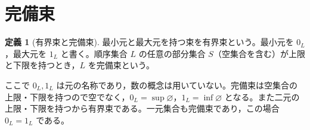 \documentclass[a5paper,10pt,dvipdfmx]{jsarticle}
\theoremstyle{definition}
\newtheorem{defn}[ruledef]{定義}
\theoremstyle{plain}
\begin{document}
\section{完備束}
\begin{defn}[有界束と完備束]\label{k85}
最小元と最大元を持つ束を有界束という。最小元を $0_L$，最大元を $1_L$ と書く。順序集合 $L$ の任意の部分集合 $S$（空集合を含む）が上限と下限を持つとき，$L$ を完備束という。
\end{defn}
ここで $0_L,1_L$ は元の名称であり，数の概念は用いていない。完備束は空集合の上限・下限を持つので空でなく，$0_L=\sup\varnothing$，$1_L=\inf\varnothing$ となる。また二元の上限・下限を持つから有界束である。一元集合も完備束であり，この場合 $0_L=1_L$ である。
\end{document}

